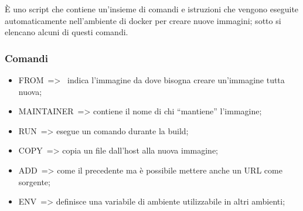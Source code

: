 \documentclass[
]{article}
\providecommand{\tightlist}{%
  \setlength{\itemsep}{0pt}\setlength{\parskip}{0pt}}
\begin{document}
{È uno script che contiene un'insieme di comandi e istruzioni che
vengono eseguite automaticamente nell'ambiente di docker per creare
nuove immagini; sotto si elencano alcuni di questi comandi.}

{}

\subsubsection{\texorpdfstring{{Comandi}}{Comandi}}\label{h.6y2j3jnxveht}

{}

\begin{itemize}
\tightlist
\item
  {FROM}{~=\textgreater{} ~indica l'immagine da dove bisogna creare
  un'immagine tutta nuova;}
\end{itemize}

{}

\begin{itemize}
\tightlist
\item
  {MAINTAINER}{~=\textgreater{} contiene il nome di chi ``mantiene''
  l'immagine;}
\end{itemize}

{}

\begin{itemize}
\tightlist
\item
  {RUN}{~=\textgreater{} esegue un comando durante la build;}
\end{itemize}

{}

\begin{itemize}
\tightlist
\item
  {COPY}{~=\textgreater{} copia un file dall'host alla nuova immagine;}
\end{itemize}

{}

\begin{itemize}
\tightlist
\item
  {ADD}{~=\textgreater{} come il precedente ma è possibile mettere anche
  un URL come sorgente;}
\end{itemize}

{}

\begin{itemize}
\tightlist
\item
  {ENV}{~=\textgreater{} definisce una variabile di ambiente
  utilizzabile in altri ambienti;}
\end{itemize}

{}
\end{document}
